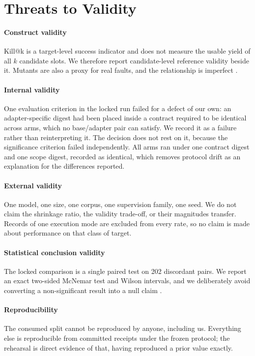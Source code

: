 \documentclass[10pt,conference]{IEEEtran}
\makeatletter
\newcommand{\killk}[1]{Kill@#1}
\makeatother
\begin{document}
\section{Threats to Validity}
\label{sec:threats}

\paragraph{Construct validity}
\killk{k} is a target-level success indicator and does not measure the usable
yield of all $k$ candidate slots. We therefore report candidate-level reference
validity beside it. Mutants are also a proxy for real faults, and the
relationship is imperfect \cite{just2014mutants,papadakis2018mutationscores}.

\paragraph{Internal validity}
One evaluation criterion in the locked run failed for a defect of our own: an
adapter-specific digest had been placed inside a contract required to be
identical across arms, which no base/adapter pair can satisfy. We record it as a
failure rather than reinterpreting it. The decision does not rest on it, because
the significance criterion failed independently. All arms ran under one
contract digest and one scope digest, recorded as identical, which removes
protocol drift as an explanation for the differences reported.

\paragraph{External validity}
One model, one size, one corpus, one supervision family, one seed. We do not
claim the shrinkage ratio, the validity trade-off, or their magnitudes transfer.
Records of one execution mode are excluded from every rate, so no claim is made
about performance on that class of target.

\paragraph{Statistical conclusion validity}
The locked comparison is a single paired test on 202 discordant pairs. We report
an exact two-sided McNemar test and Wilson intervals, and we deliberately avoid
converting a non-significant result into a null claim
\cite{arcuri2014hitchhiker,wasserstein2016asa}.

\paragraph{Reproducibility}
The consumed split cannot be reproduced by anyone, including us. Everything
else is reproducible from committed receipts under the frozen protocol; the
rehearsal is direct evidence of that, having reproduced a prior value exactly.
\end{document}
